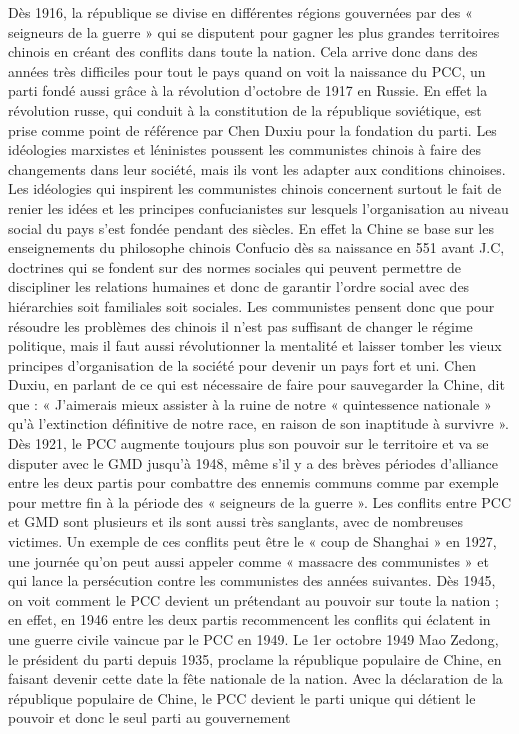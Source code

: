 Dès 1916, la république se divise en différentes régions gouvernées par des « seigneurs de la guerre » qui se disputent pour gagner les plus grandes territoires chinois en créant des conflits dans toute la nation.  Cela arrive donc dans des années très difficiles pour tout le pays quand on voit la naissance du PCC, un parti fondé aussi grâce à la révolution d’octobre de 1917 en Russie.  En effet la révolution russe, qui conduit à la constitution de la république soviétique, est prise comme point de référence par Chen Duxiu pour la fondation du parti.  Les idéologies marxistes et léninistes poussent les communistes chinois à faire des changements dans leur société, mais ils vont les adapter aux conditions chinoises. Les idéologies qui inspirent les communistes chinois concernent surtout le fait de renier les idées et les principes confucianistes sur lesquels l’organisation au niveau social du pays s’est fondée pendant des siècles. En effet la Chine se base sur les enseignements du philosophe chinois Confucio dès sa naissance en 551 avant J.C, doctrines qui se fondent sur des normes sociales qui peuvent permettre de discipliner les relations humaines et donc de garantir l’ordre social avec des hiérarchies soit familiales soit sociales. Les communistes pensent donc que pour résoudre les problèmes des chinois il n’est pas suffisant de changer le régime politique, mais il faut aussi révolutionner la mentalité et laisser tomber les vieux principes d’organisation de la société pour devenir un pays fort et uni. Chen Duxiu, en parlant de ce qui est nécessaire de faire pour sauvegarder la Chine, dit que : « J’aimerais mieux assister à la ruine de notre « quintessence nationale » qu’à l’extinction définitive de notre race, en raison de son inaptitude à survivre ».  
Dès 1921, le PCC augmente toujours plus son pouvoir sur le territoire et va se disputer avec le GMD jusqu'à 1948, même s’il y a des brèves périodes d’alliance entre les deux partis pour combattre des ennemis communs comme par exemple pour mettre fin à la période des « seigneurs de la guerre ».  Les conflits entre PCC et GMD sont plusieurs et ils sont aussi très sanglants, avec de nombreuses victimes. Un exemple de ces conflits peut être le « coup de Shanghai » en 1927, une journée qu’on peut aussi appeler comme « massacre des communistes » et qui lance la persécution contre les communistes des années suivantes.  Dès 1945, on voit comment le PCC devient un prétendant au pouvoir sur toute la nation ; en effet, en 1946 entre les deux partis recommencent les conflits qui éclatent in une guerre civile vaincue par le PCC en 1949.  Le 1er octobre 1949 Mao Zedong, le président du parti depuis 1935, proclame la république populaire de Chine,  en faisant devenir cette date la fête nationale de la nation. Avec la déclaration de la république populaire de Chine, le PCC devient le parti unique qui détient le pouvoir et donc le seul parti au gouvernement

